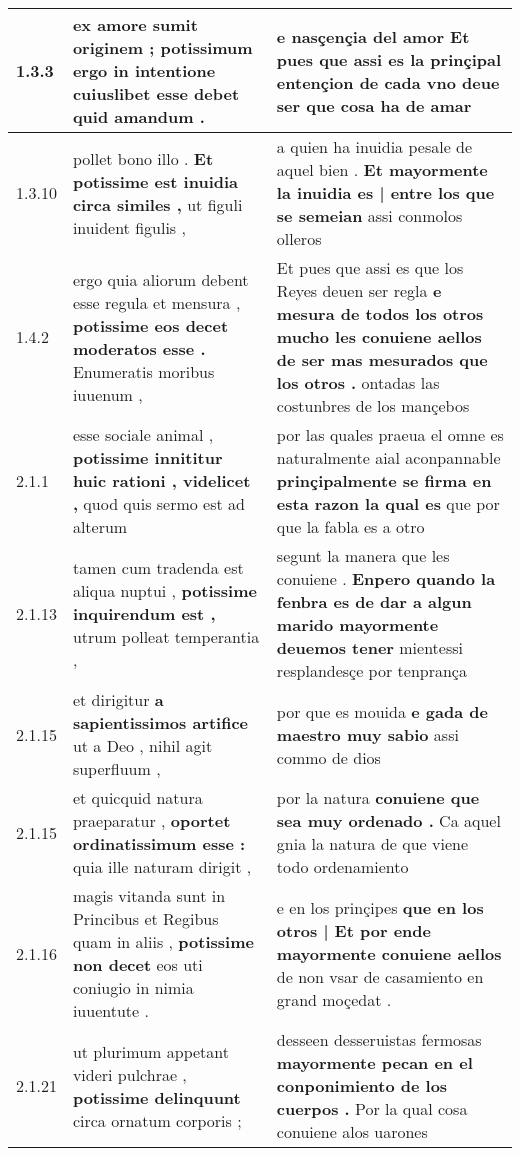 \begin{tabular}{|p{1cm}|p{6.5cm}|p{6.5cm}|}
1.3.3 & ex amore sumit originem ; \textbf{ potissimum ergo in intentione cuiuslibet } esse debet quid amandum . & e nasçençia del amor \textbf{ Et pues que assi es la prinçipal entençion de cada vno deue ser } que cosa ha de amar \\\hline
1.3.10 & pollet bono illo . \textbf{ Et potissime est inuidia circa similes , } ut figuli inuident figulis , & a quien ha inuidia pesale de aquel bien . \textbf{ Et mayormente la inuidia es | entre los que se semeian } assi conmolos olleros \\\hline
1.4.2 & ergo quia aliorum debent esse regula et mensura , \textbf{ potissime eos decet moderatos esse . } Enumeratis moribus iuuenum , & Et pues que assi es que los Reyes deuen ser regla \textbf{ e mesura de todos los otros mucho les conuiene aellos de ser mas mesurados que los otros . } ontadas las costunbres de los mançebos \\\hline
2.1.1 & esse sociale animal , \textbf{ potissime innititur huic rationi , videlicet , } quod quis sermo est ad alterum & por las quales praeua el omne es naturalmente aial aconpannable \textbf{ prinçipalmente se firma en esta razon la qual es } que por que la fabla es a otro \\\hline
2.1.13 & tamen cum tradenda est aliqua nuptui , \textbf{ potissime inquirendum est , } utrum polleat temperantia , & segunt la manera que les conuiene . \textbf{ Enpero quando la fenbra es de dar a algun marido mayormente deuemos tener } mientessi resplandesçe por tenprança \\\hline
2.1.15 & et dirigitur \textbf{ a sapientissimos artifice } ut a Deo , nihil agit superfluum , & por que es mouida \textbf{ e gada de maestro muy sabio } assi commo de dios \\\hline
2.1.15 & et quicquid natura praeparatur , \textbf{ oportet ordinatissimum esse : } quia ille naturam dirigit , & por la natura \textbf{ conuiene que sea muy ordenado . } Ca aquel gnia la natura de que viene todo ordenamiento \\\hline
2.1.16 & magis vitanda sunt in Princibus et Regibus quam in aliis , \textbf{ potissime non decet } eos uti coniugio in nimia iuuentute . & e en los prinçipes \textbf{ que en los otros | Et por ende mayormente conuiene aellos } de non vsar de casamiento en grand moçedat . \\\hline
2.1.21 & ut plurimum appetant videri pulchrae , \textbf{ potissime delinquunt } circa ornatum corporis ; & desseen desseruistas fermosas \textbf{ mayormente pecan en el conponimiento de los cuerpos . } Por la qual cosa conuiene alos uarones \\\hline

\end{tabular}
